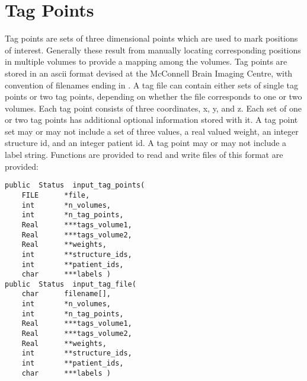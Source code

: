 \chapter{Tag Points}

Tag points are sets of three dimensional points which are used to mark
positions of interest.  Generally these result from manually locating
corresponding positions in multiple volumes to provide a mapping among
the volumes.  Tag points are stored in an ascii format devised at the
McConnell Brain Imaging Centre, with convention of filenames ending in
.  A tag file can contain either sets of single tag points
or two tag points, depending on whether the file corresponds to one or
two volumes.  Each tag point consists of three coordinates, x, y, and
z.  Each set of one or two tag points has additional optional
information stored with it.  A tag point set may or may not include a
set of three values, a real valued weight, an integer structure id,
and an integer patient id.  A tag point may or may not include a label
string.  Functions are provided to read and write files of this
format are provided:

{\bf\begin{verbatim}
public  Status  input_tag_points(
    FILE      *file,
    int       *n_volumes,
    int       *n_tag_points,
    Real      ***tags_volume1,
    Real      ***tags_volume2,
    Real      **weights,
    int       **structure_ids,
    int       **patient_ids,
    char      ***labels )
public  Status  input_tag_file(
    char      filename[],
    int       *n_volumes,
    int       *n_tag_points,
    Real      ***tags_volume1,
    Real      ***tags_volume2,
    Real      **weights,
    int       **structure_ids,
    int       **patient_ids,
    char      ***labels )
\end{verbatim}}


